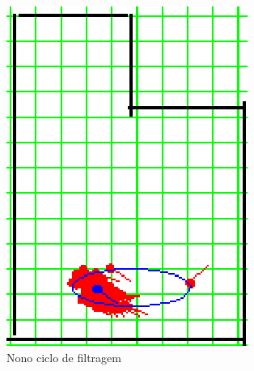 \begin{figure}[H]
  \centering
  \includegraphics[scale=0.6]{figuras/cen1_ex1/10.eps}
  \caption[Nono Ciclo de Filtragem]{Nono ciclo de filtragem}
  \label{img:cen1_ex1_10}
\end{figure}
